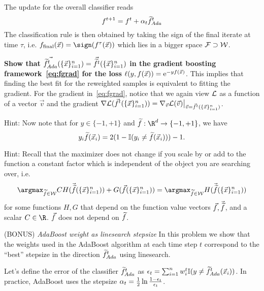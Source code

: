 \documentclass[preview]{standalone}
\begin{document}
\begin{Parts}
The update for the overall classifier reads
\begin{equation}
\label{eq:AdaUpdate}
f^{t+1} = f^t + \alpha_t \widetilde{f}^{t}_{Ada} 
\end{equation}
The classification rule is then obtained by taking the sign of the final
iterate at time $\tau$, i.e. $\hatF(\vec{x}) = \sign(\Func^{\tau}(\vec{x}))$
which lies in a bigger space $\mathcal{F} \supset \mathcal{W}$.




{\bf Show that $\vec{\widetilde{f}^{t}_{Ada}}(\{\vec{x}\}_{i=1}^n) = \vec{\widetilde{f}^{t}}(\{\vec{x}\}_{i=1}^n)$ in the gradient boosting framework~\eqref{eq:fgrad} for the loss $\ell(y,f(\vec{x})) = \text{e}^{-yf(\vec{x})}$}. This implies that finding the best fit for the reweighted samples is equivalent to fitting the gradient. For the gradient in~\eqref{eq:fgrad}, notice that we again view $\mathcal{L}$ as a function of a vector $\vec{v}$ and the gradient $\nabla \mathcal{L}(\vec{f}^t(\{\vec{x}\}_{i=1}^n)) = \nabla_{\vec{v}} \mathcal{L}(\vec{v})\big\vert_{\vec{v} = \vec{f}^t(\{\vec{x}\}_{i=1}^n)}$.

    Hint: Now note that for $y \in \{-1,+1\}$ and $\func: \R^d \to \{-1,+1\}$, we have
  \begin{equation}
    \label{eq:same}
    y_i \widetilde{f}(\vec{x}_i) = 2 (1-\mathbb{I}(y_i \neq \widetilde{f}(\vec{x}_i))) - 1.
  \end{equation}


  Hint: Recall that the maximizer does not change if you scale by or add to the function a constant factor which is independent of the object you are searching over, i.e.
  \begin{equation*}
    \argmax_{\func \in \weakspace} C H(\fvec(\xn)) + G(\Fvec(\xn)) = \argmax_{\func\in\weakspace} H(\fvec(\xn))
  \end{equation*}
  for some functions $H, G$ that depend on the function value vectors $\vec{f}, \vec{{\widetilde{f}}}$, and a scalar $C \in\R$. $\vec{f}$ does not depend on $\widetilde{f}$.

  
    


\Part (BONUS) \emph{AdaBoost weight as linesearch stepsize} In this problem we show that the weights used in the AdaBoost algorithm at each time step $t$ correspond to the ``best'' stepsize in the direction $\widetilde{f}^{t}_{Ada}$ using linesearch.

  Let's define the error of the classifier $\widetilde{f}^{t}_{Ada}$ as $\epsilon_{t} = \sum_{i=1}^n w_{i}^{t} \mathbb{I}(y\neq \widetilde{f}^{t}_{Ada}(\vec{x}_i))$. In practice, AdaBoost uses the stepsize  $\alpha_t = \frac{1}{2} \ln \frac{1-\epsilon_{t}}{\epsilon_{t}}$.


\end{Parts}
\end{document}
